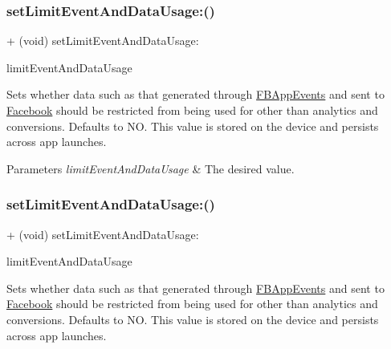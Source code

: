 \subsubsection{\texorpdfstring{set\+Limit\+Event\+And\+Data\+Usage\+:()}{setLimitEventAndDataUsage:()}\hspace{0.1cm}{\footnotesize\ttfamily [4/5]}}
{\footnotesize\ttfamily + (void) set\+Limit\+Event\+And\+Data\+Usage\+: \begin{DoxyParamCaption}\item[{(B\+O\+OL)}]{limit\+Event\+And\+Data\+Usage }\end{DoxyParamCaption}}

Sets whether data such as that generated through \hyperlink{interfaceFBAppEvents}{F\+B\+App\+Events} and sent to \hyperlink{interfaceFacebook}{Facebook} should be restricted from being used for other than analytics and conversions. Defaults to NO. This value is stored on the device and persists across app launches.


\begin{DoxyParams}{Parameters}
{\em limit\+Event\+And\+Data\+Usage} & The desired value. \\
\hline
\end{DoxyParams}
\mbox{\label{interfaceFBSettings_ab0e8e19825a865db7cbf58da4957cf40}} 
\subsubsection{\texorpdfstring{set\+Limit\+Event\+And\+Data\+Usage\+:()}{setLimitEventAndDataUsage:()}\hspace{0.1cm}{\footnotesize\ttfamily [5/5]}}
{\footnotesize\ttfamily + (void) set\+Limit\+Event\+And\+Data\+Usage\+: \begin{DoxyParamCaption}\item[{(B\+O\+OL)}]{limit\+Event\+And\+Data\+Usage }\end{DoxyParamCaption}}

Sets whether data such as that generated through \hyperlink{interfaceFBAppEvents}{F\+B\+App\+Events} and sent to \hyperlink{interfaceFacebook}{Facebook} should be restricted from being used for other than analytics and conversions. Defaults to NO. This value is stored on the device and persists across app launches.


